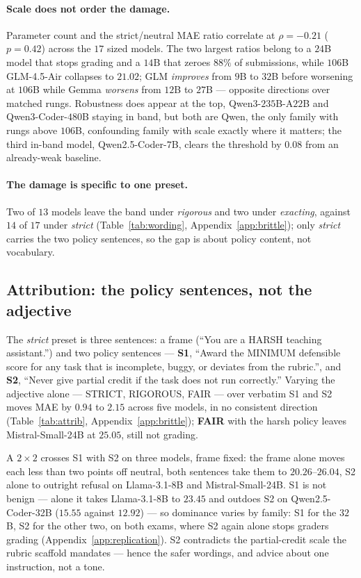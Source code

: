 \paragraph{Scale does not order the damage.}
Parameter count and the strict/neutral MAE ratio correlate at $\rho = -0.21$ ($p = 0.42$) across the $17$ sized models. The two largest ratios belong to a $24$B model that stops grading and a $14$B that zeroes $88\%$ of submissions, while $106$B GLM-4.5-Air collapses to $21.02$; GLM \emph{improves} from $9$B to $32$B before worsening at $106$B while Gemma \emph{worsens} from $12$B to $27$B --- opposite directions over matched rungs. Robustness does appear at the top, Qwen3-$235$B-A$22$B and Qwen3-Coder-$480$B staying in band, but both are Qwen, the only family with rungs above $106$B, confounding family with scale exactly where it matters; the third in-band model, Qwen2.5-Coder-$7$B, clears the threshold by $0.08$ from an already-weak baseline.

\paragraph{The damage is specific to one preset.}
Two of $13$ models leave the band under \emph{rigorous} and two under \emph{exacting}, against $14$ of $17$ under \emph{strict} (Table~\ref{tab:wording}, Appendix~\ref{app:brittle}); only \emph{strict} carries the two policy sentences, so the gap is about policy content, not vocabulary.

\subsection{Attribution: the policy sentences, not the adjective}
\label{sec:brittle:attrib}

The \emph{strict} preset is three sentences: a frame (``You are a HARSH teaching assistant.'') and two policy sentences --- \textbf{S1}, ``Award the MINIMUM defensible score for any task that is incomplete, buggy, or deviates from the rubric.'', and \textbf{S2}, ``Never give partial credit if the task does not run correctly.'' Varying the adjective alone --- STRICT, RIGOROUS, FAIR --- over verbatim S1 and S2 moves MAE by $0.94$ to $2.15$ across five models, in no consistent direction (Table~\ref{tab:attrib}, Appendix~\ref{app:brittle}); \textbf{FAIR} with the harsh policy leaves Mistral-Small-24B at $25.05$, still not grading.

A $2 \times 2$ crosses S1 with S2 on three models, frame fixed: the frame alone moves each less than two points off neutral, both sentences take them to $20.26$--$26.04$, S2 alone to outright refusal on Llama-3.1-8B and Mistral-Small-24B. S1 is not benign --- alone it takes Llama-3.1-8B to $23.45$ and outdoes S2 on Qwen2.5-Coder-32B ($15.55$ against $12.92$) --- so dominance varies by family: S1 for the $32$B, S2 for the other two, on both exams, where S2 again alone stops graders grading (Appendix~\ref{app:replication}). S2 contradicts the partial-credit scale the rubric scaffold mandates --- hence the safer wordings, and advice about one instruction, not a tone.

